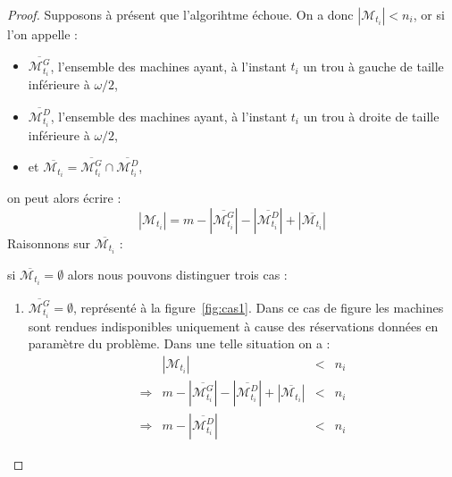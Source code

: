 \documentclass[a4paper,9pt]{article}
\begin{document}
\begin{proof}
    Supposons à présent que l'algorihtme échoue. On a donc $|\mathcal{M}_{t_i}| < n_i$, or si l'on
    appelle : 
    \begin{itemize}
        \item $\overline{\mathcal{M}_{t_i}^G}$, l'ensemble des machines ayant, à l'instant $t_i$ un
            trou à gauche de taille inférieure à $\omega / 2$,
        \item $\overline{\mathcal{M}_{t_i}^D}$, l'ensemble des machines ayant, à l'instant $t_i$ un
            trou à droite de taille inférieure à $\omega / 2$,
        \item et $\overline{\mathcal{M}_{t_i}} = \overline{\mathcal{M}_{t_i}^G} \cap
            \overline{\mathcal{M}_{t_i}^D}$,
    \end{itemize}
    on peut alors écrire : \begin{displaymath}
        |\mathcal{M}_{t_i}| = m - |\overline{\mathcal{M}_{t_i}^G}| -
        |\overline{\mathcal{M}_{t_i}^D}| +
        |\overline{\mathcal{M}_{t_i}}|
    \end{displaymath}
    Raisonnons sur $\overline{\mathcal{M}_{t_i}}$ :
    \begin{bitemize}
        \item si $\overline{\mathcal{M}_{t_i}} = \emptyset$ alors nous pouvons distinguer trois cas
            :
            \begin{enumerate}
                \item $\overline{\mathcal{M}_{t_i}^G} = \emptyset$, représenté à la
                    figure~\ref{fig:cas1}. Dans ce cas de figure les machines sont rendues
                    indisponibles uniquement à cause des réservations données en paramètre du
                    problème. Dans une telle situation on a :
                    \begin{displaymath}
                        \begin{array}{rrcl}
                            & |\mathcal{M}_{t_i}| & < & n_i \\
                            \Rightarrow &  m - |\overline{\mathcal{M}_{t_i}^G}| -
                            |\overline{\mathcal{M}_{t_i}^D}| +
                            |\overline{\mathcal{M}_{t_i}}| & < & n_i \\
                            \Rightarrow & m - |\overline{\mathcal{M}_{t_i}^D}| & < & n_i
                        \end{array}
                    \end{displaymath}

\end{enumerate}
\end{bitemize}
\end{proof}
\end{document}
